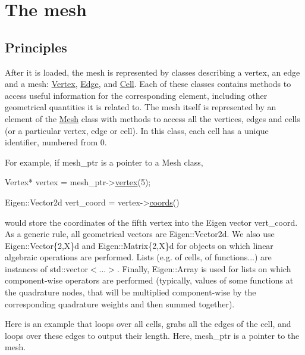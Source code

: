 \label{_mesh}%
 \hypertarget{index_mesh}{}\section{The mesh}\label{index_mesh}
\hypertarget{index_meshpple}{}\subsection{Principles}\label{index_meshpple}
After it is loaded, the mesh is represented by classes describing a vertex, an edge and a mesh\+: \hyperlink{classHArDCore2D_1_1Vertex}{Vertex}, \hyperlink{classHArDCore2D_1_1Edge}{Edge}, and \hyperlink{classHArDCore2D_1_1Cell}{Cell}. Each of these classes contains methods to access useful information for the corresponding element, including other geometrical quantities it is related to. The mesh itself is represented by an element of the \hyperlink{classHArDCore2D_1_1Mesh}{Mesh} class with methods to access all the vertices, edges and cells (or a particular vertex, edge or cell). In this class, each cell has a unique identifier, numbered from 0.

For example, if {\ttfamily mesh\+\_\+ptr} is a pointer to a Mesh class, 
\begin{DoxyCode}
Vertex* vertex = mesh\_ptr->\hyperlink{classHArDCore2D_1_1Mesh_ad099224c697c05a57fad6a47fdcd9e76}{vertex}(5);

Eigen::Vector2d vert\_coord = vertex->\hyperlink{group__Mesh_gade92964c93627c034b021c1d23075a79}{coords}()
\end{DoxyCode}
 would store the coordinates of the fifth vertex into the Eigen vector vert\+\_\+coord. As a generic rule, all geometrical vectors are {\ttfamily Eigen\+::\+Vector2d}. We also use {\ttfamily Eigen\+::\+Vector\{2,X\}d} and {\ttfamily Eigen\+::\+Matrix\{2,X\}d} for objects on which linear algebraic operations are performed. Lists (e.\+g. of cells, of functions...) are instances of {\ttfamily std\+::vector$<$...$>$}. Finally, {\ttfamily Eigen\+::\+Array} is used for lists on which component-\/wise operators are performed (typically, values of some functions at the quadrature nodes, that will be multiplied component-\/wise by the corresponding quadrature weights and then summed together).

Here is an example that loops over all cells, grabs all the edges of the cell, and loops over these edges to output their length. Here, {\ttfamily mesh\+\_\+ptr} is a pointer to the mesh.


